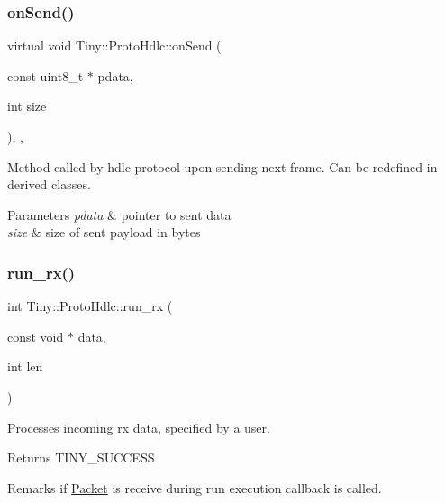 \subsubsection{\texorpdfstring{on\+Send()}{onSend()}}
{\footnotesize\ttfamily virtual void Tiny\+::\+Proto\+Hdlc\+::on\+Send (\begin{DoxyParamCaption}\item[{const uint8\+\_\+t $\ast$}]{pdata,  }\item[{int}]{size }\end{DoxyParamCaption})\hspace{0.3cm}{\ttfamily [inline]}, {\ttfamily [protected]}, {\ttfamily [virtual]}}

Method called by hdlc protocol upon sending next frame. Can be redefined in derived classes. 
\begin{DoxyParams}{Parameters}
{\em pdata} & pointer to sent data \\
\hline
{\em size} & size of sent payload in bytes \\
\hline
\end{DoxyParams}
\mbox{\label{classTiny_1_1ProtoHdlc_ae54e74de1a47d386f079c840fd830fe0}} 
\subsubsection{\texorpdfstring{run\+\_\+rx()}{run\_rx()}}
{\footnotesize\ttfamily int Tiny\+::\+Proto\+Hdlc\+::run\+\_\+rx (\begin{DoxyParamCaption}\item[{const void $\ast$}]{data,  }\item[{int}]{len }\end{DoxyParamCaption})}

Processes incoming rx data, specified by a user. \begin{DoxyReturn}{Returns}
T\+I\+N\+Y\+\_\+\+S\+U\+C\+C\+E\+SS 
\end{DoxyReturn}
\begin{DoxyRemark}{Remarks}
if \hyperlink{classTiny_1_1Packet}{Packet} is receive during run execution callback is called. 
\end{DoxyRemark}
\mbox{\label{classTiny_1_1ProtoHdlc_a73415a63c389b3cbd0601a2ed49fd6e9}} 
